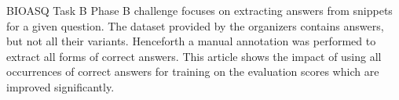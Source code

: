 BIOASQ Task B Phase B challenge focuses on extracting answers from snippets for a given question. The dataset provided by the organizers contains answers, but not all their variants. Henceforth a manual annotation was performed to extract all forms of correct answers. This article shows the impact of using all occurrences of correct answers for training on the evaluation scores which are improved significantly.
